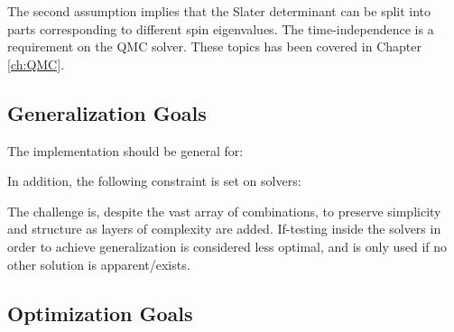 The second assumption implies that the Slater determinant can be split into parts corresponding to different spin eigenvalues. The time-independence is a requirement on the QMC solver. These topics has been covered in Chapter \ref{ch:QMC}.

\subsection{Generalization Goals}
\label{sec:genGoals}

The implementation should be general for:

 
In addition, the following constraint is set on solvers:



The challenge is, despite the vast array of combinations, to preserve simplicity and structure as layers of complexity are added. If-testing inside the solvers in order to achieve generalization is considered less optimal, and is only used if no other solution is apparent/exists.

\subsection{Optimization Goals}
\label{sec:optGoals}


